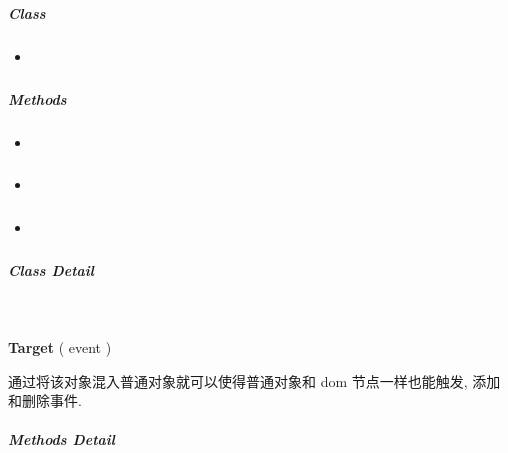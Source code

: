 \documentclass[letterpaper,10pt,english]{sphinxmanual}
\begin{document}
\subparagraph{Class}
\label{api/core/event/event-target:class}\begin{itemize}
\item {}
{\hyperref[api/core/event/event-target:Event.Target]{}}

\end{itemize}


\subparagraph{Methods}
\label{api/core/event/event-target:methods}\begin{itemize}
\item {}
{\hyperref[api/core/event/fire:Event.fire]{}}

\item {}
{\hyperref[api/core/event/on:Event.on]{}}

\item {}
{\hyperref[api/core/event/detach:Event.detach]{}}

\end{itemize}


\subparagraph{Class Detail}
\label{api/core/event/event-target:class-detail}

\begin{fulllineitems}
\label{api/core/event/event-target:Event.Target}~
\begin{DUlineblock}{0em}
\item[] \textbf{Target} ( event )
\item[] 通过将该对象混入普通对象就可以使得普通对象和 dom 节点一样也能触发, 添加和删除事件.
\end{DUlineblock}

\end{fulllineitems}



\subparagraph{Methods Detail}
\label{api/core/event/event-target:methods-detail}
\end{document}
